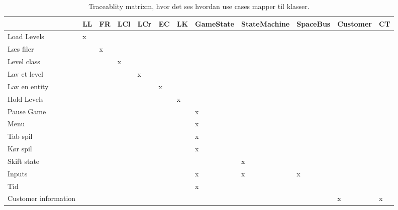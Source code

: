 \begin{table}[h!]
\hspace{-95pt}
\begin{tabular}{|l|l|l|l|l|l|l|l|l|l|l|l|}
\hline
               & LL & FR & LCl & LCr & EC & LK & GameState & StateMachine & SpaceBus &Customer & CT\\\hline

Load Levels   &          x           &            &       &      &              &       &       &       &      &&\\\hline
Læs filer    &         &              x          &       &      &              &       &       &       &       &&\\\hline
Level class        &         &             &             x    &      &              &      &       &          &     &&\\\hline
Lav et level  &         &             &            &       x&                   &       &       &       &       &&\\\hline
Lav en entity &         &             &            &       &     x &                      &       &       &     &&\\\hline
Hold Levels   &         &             &            &       &      &x            &            &       & &&\\\hline
Pause Game &         &             &            &       &      &                      &x       &       &     &&\\\hline
Menu &         &             &            &       &      &                      &x       &       &     &&\\\hline
Tab spil &         &             &            &       &      &                      &x       &       &     &&\\\hline
Kør spil &         &             &            &       &      &                      &x       &       &     &&\\\hline
Skift state &         &             &            &       &      &                      &       &x       &     &&\\\hline
Inputs &         &             &            &       &      &                      & x           & x   & x  &&\\\hline
Tid &         &             &            &       &      &                      & x           &    &   &&\\\hline
Customer information &         &             &            &       &      &                      &            &    &   &x&x\\\hline
\end{tabular}
\label{traceability}
\caption{Traceablity matrixm, hvor det ses hvordan use cases mapper til klasser.}
\end{table}

